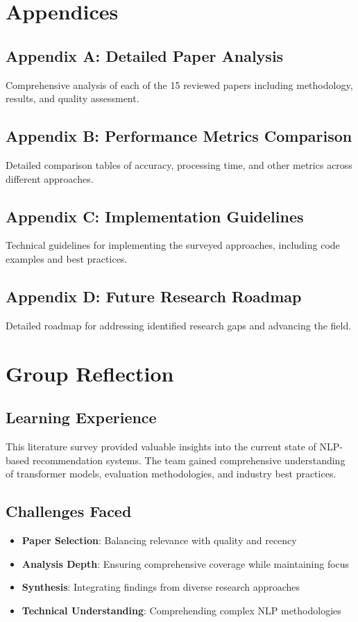 \documentclass[12pt,a4paper]{article}
\begin{document}

\section{Appendices}

\subsection{Appendix A: Detailed Paper Analysis}
Comprehensive analysis of each of the 15 reviewed papers including methodology, results, and quality assessment.

\subsection{Appendix B: Performance Metrics Comparison}
Detailed comparison tables of accuracy, processing time, and other metrics across different approaches.

\subsection{Appendix C: Implementation Guidelines}
Technical guidelines for implementing the surveyed approaches, including code examples and best practices.

\subsection{Appendix D: Future Research Roadmap}
Detailed roadmap for addressing identified research gaps and advancing the field.


\section{Group Reflection}

\subsection{Learning Experience}
This literature survey provided valuable insights into the current state of NLP-based recommendation systems. The team gained comprehensive understanding of transformer models, evaluation methodologies, and industry best practices.

\subsection{Challenges Faced}
\begin{itemize}
    \item \textbf{Paper Selection}: Balancing relevance with quality and recency
    \item \textbf{Analysis Depth}: Ensuring comprehensive coverage while maintaining focus
    \item \textbf{Synthesis}: Integrating findings from diverse research approaches
    \item \textbf{Technical Understanding}: Comprehending complex NLP methodologies
\end{itemize}
\end{document}
